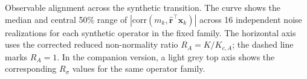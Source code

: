 \caption{Observable alignment across the synthetic transition. The curve shows the median and central 50\% range of $|\mathrm{corr}(m_k,\widehat{\mathbf{r}}^{\top}\mathbf{x}_k)|$ across 16 independent noise realizations for each synthetic operator in the fixed family. The horizontal axis uses the corrected reduced non-normality ratio $R_A=K/K_{c,A}$; the dashed line marks $R_A=1$. In the companion version, a light grey top axis shows the corresponding $R_\sigma$ values for the same operator family.}